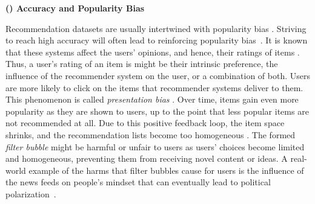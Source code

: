 

\vspace{0.25cm}
\noindent \textbf{() Accuracy and Popularity Bias}
\vspace{0.25cm}

Recommendation datasets are usually intertwined with popularity bias \cite{celma2008hits,lee2014fairness}. Striving to reach high accuracy will often lead to reinforcing popularity bias~\cite{barocas2016big}. It is known that these systems affect the users’ opinions, and hence, their ratings of items \cite{Cosley2003Influence}. Thus, a user’s rating of an item is might be their intrinsic preference, the influence of the recommender system on the user, or a combination of both. Users are more likely to click on the items that recommender systems deliver to them. This phenomenon is called \textit{presentation bias} \cite{baeza2018bias}. 
Over time, items gain even more popularity as they are shown to users, up to the point that less popular items are not recommended at all. Due to this positive feedback loop, the item space shrinks, and the recommendation lists become too homogeneous \cite{Chaney2018Homogeneity}. The formed \textit{filter bubble} might be harmful or unfair to users as users' choices become limited and homogeneous, preventing them from receiving novel content or ideas. A real-world example of the harms that filter bubbles cause for users is the influence of the news feeds on people's mindset that can eventually lead to political polarization~\cite{HONG2016777}.


